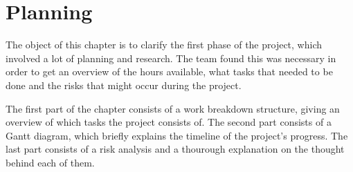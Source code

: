 \chapter{Planning}

The object of this chapter is to clarify the first phase of the project, which involved a lot of planning and research. The team found this was necessary in order to get an overview of the hours available, what tasks that needed to be done and the risks that might occur during the project.

The first part of the chapter consists of a work breakdown structure, giving an overview of which tasks the project consists of. The second part consists of a Gantt diagram, which briefly explains the timeline of the project's progress. The last part consists of a risk analysis and a thourough explanation on the thought behind each of them.


\newpage


\newpage


\newpage

